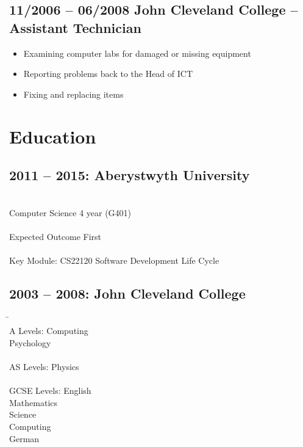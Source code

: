 \documentclass[0pt]{article}
\begin{document}
\subsection*{11/2006 -- 06/2008      John Cleveland College -- Assistant Technician}
\begin{itemize}
	\item Examining computer labs for damaged or missing equipment
	\item Reporting problems back to the Head of ICT
	\item Fixing and replacing items
\end{itemize}

\section*{Education}
\subsection*{2011 -- 2015: Aberystwyth University}
\begin{tabbing}
~~~~~~~~~~~~~~~~~~~~~~~~\=\\
\> Computer Science 4 year (G401)\\
\\
\> Expected Outcome First\\
\\
\> Key Module: CS22120 Software Development Life Cycle   
\end{tabbing}

\subsection*{2003 -- 2008: John Cleveland College}  
\begin{tabbing}
\=~~~~~~~~~~~~~~~~~~~~~~~~\=\\
\> A Levels:  \>Computing \\

\>\>Psychology\\
\\
\> AS Levels: \>Physics \\
\\
\> GCSE Levels: \>English\\

\>\>Mathematics\\

\>\>Science\\

\>\>Computing\\

\>\>German\\
\end{tabbing}
\end{document}
